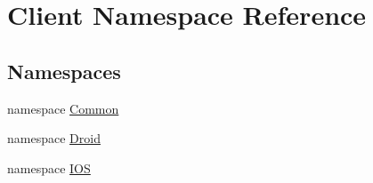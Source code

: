 \hypertarget{namespaceClient}{}\section{Client Namespace Reference}
\label{namespaceClient}
\subsection*{Namespaces}
\begin{DoxyCompactItemize}
\item 
namespace \hyperlink{namespaceClient_1_1Common}{Common}
\item 
namespace \hyperlink{namespaceClient_1_1Droid}{Droid}
\item 
namespace \hyperlink{namespaceClient_1_1IOS}{I\+O\+S}
\end{DoxyCompactItemize}
